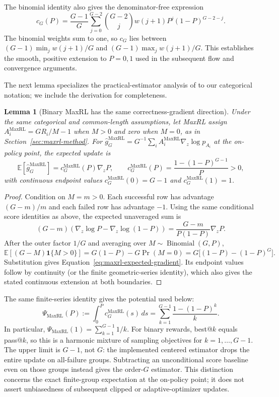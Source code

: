 \documentclass{article}
\newcommand{\1}{\mathbf 1}
\newcommand{\E}{\mathbb E}
\newtheorem{lemma}{Lemma}[section]
\theoremstyle{remark}
\theoremstyle{definition}
\theoremstyle{plain}
\begin{document}
The binomial identity also gives the denominator-free expression
\[
 c_G(P)=\frac{G-1}{G}\sum_{j=0}^{G-2}\binom{G-2}{j}
 w(j+1)P^j(1-P)^{G-2-j}.
\]
The binomial weights sum to one, so $c_G$ lies between
$(G-1)\min_j w(j+1)/G$ and $(G-1)\max_j w(j+1)/G$.
This establishes the smooth, positive extension to $P=0,1$ used in the
subsequent flow and convergence arguments.

The next lemma specializes the practical-estimator analysis of
\citet[Section~4.3 and Appendix~D, Theorem~5]{tajwar2026maxrl}
to our categorical notation; we include the derivation for completeness.

\begin{lemma}[Binary MaxRL has the same correctness-gradient direction]
\label{lem:maxrl-mean}
Under the same categorical and common-length assumptions, let MaxRL assign
$A_i^{\mathrm{MaxRL}}=GR_i/M-1$ when $M>0$ and zero when $M=0$, as in
Section~\ref{sec:maxrl-method}. For
$\widehat g_G^{\mathrm{MaxRL}}=G^{-1}\sum_i
 A_i^{\mathrm{MaxRL}}\nabla_z\log p_{A_i}$ at the on-policy point, the
expected update is
\begin{equation}
  \E[\widehat g_G^{\mathrm{MaxRL}}]
  =c_G^{\mathrm{MaxRL}}(P)\nabla_zP,
  \qquad
  c_G^{\mathrm{MaxRL}}(P)
  =\frac{1-(1-P)^{G-1}}{P}>0,
  \label{eq:maxrl-expected-gradient}
\end{equation}
with continuous endpoint values
$c_G^{\mathrm{MaxRL}}(0)=G-1$ and
$c_G^{\mathrm{MaxRL}}(1)=1$.
\end{lemma}

\begin{proof}
Condition on $M=m>0$. Each successful row has advantage $(G-m)/m$ and each
failed row has advantage $-1$. Using the same conditional score identities as
above, the expected unaveraged sum is
\[
  (G-m)\!\left(\nabla_z\log P-\nabla_z\log(1-P)\right)
  =\frac{G-m}{P(1-P)}\nabla_zP.
\]
After the outer factor $1/G$ and averaging over
$M\sim\operatorname{Binomial}(G,P)$,
\[
 \E[(G-M)\1\{M>0\}]
 =G(1-P)-G\Pr(M=0)
 =G\big[(1-P)-(1-P)^G\big].
\]
Substitution gives Equation~\eqref{eq:maxrl-expected-gradient}. Its endpoint
values follow by continuity (or the finite geometric-series identity), which
also gives the stated continuous extension at both boundaries.
\end{proof}

The same finite-series identity gives the potential used below:
\begin{equation}
 \Psi_{\mathrm{MaxRL}}(P)
 :=\int_0^P c_G^{\mathrm{MaxRL}}(s)\,ds
 =\sum_{k=1}^{G-1}\frac{1-(1-P)^k}{k}.
 \label{eq:maxrl-potential-finite-sum}
\end{equation}
In particular, $\Psi_{\mathrm{MaxRL}}(1)=\sum_{k=1}^{G-1}1/k$.
For binary rewards, best@\(k\) equals pass@\(k\), so this is a harmonic
mixture of sampling objectives for $k=1,\ldots,G-1$. The upper limit is
$G-1$, not $G$: the implemented centered estimator drops the entire update
on all-failure groups. Subtracting an unconditional score baseline even on
those groups instead gives the order-$G$ estimator. This distinction concerns
the exact finite-group expectation at the on-policy point; it does not assert
unbiasedness of subsequent clipped or adaptive-optimizer updates.
\end{document}
